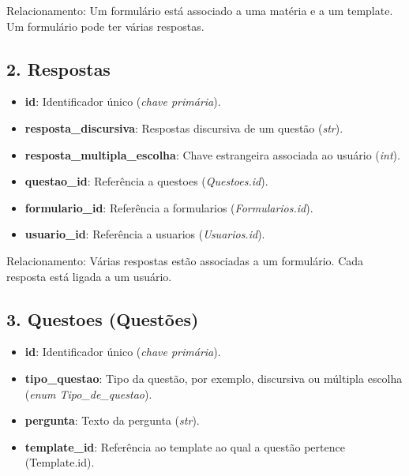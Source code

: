 \documentclass[a4paper,12pt]{article}
\begin{document}
Relacionamento: Um formulário está associado a uma matéria e a um template. Um formulário pode ter várias respostas. 

\subsection*{2. Respostas}

\begin{itemize}

    \item \textbf{id}: Identificador único (\textit{chave primária}).

    \item \textbf{resposta\_discursiva}: Respostas discursiva de um questão (\textit{str}).

    \item \textbf{resposta\_multipla\_escolha}: Chave estrangeira associada ao usuário (\textit{int}).

    \item \textbf{questao\_id}: Referência a questoes (\textit{Questoes.id}).

    \item \textbf{formulario\_id}: Referência a formularios (\textit{Formularios.id}).
    
    \item \textbf{usuario\_id}: Referência a usuarios (\textit{Usuarios.id}).

\end{itemize}

Relacionamento: Várias respostas estão associadas a um formulário. Cada resposta está ligada a um usuário.

\subsection*{3. Questoes (Questões)}

\begin{itemize}

    \item \textbf{id}: Identificador único (\textit{chave primária}).

    \item \textbf{tipo\_questao}: Tipo da questão, por exemplo, discursiva ou múltipla escolha (\textit{enum Tipo\_de\_questao}).
    
    \item \textbf{pergunta}: Texto da pergunta (\textit{str}).

    \item \textbf{template\_id}: Referência ao template ao qual a questão pertence (Template.id).

\end{itemize}
\end{document}
